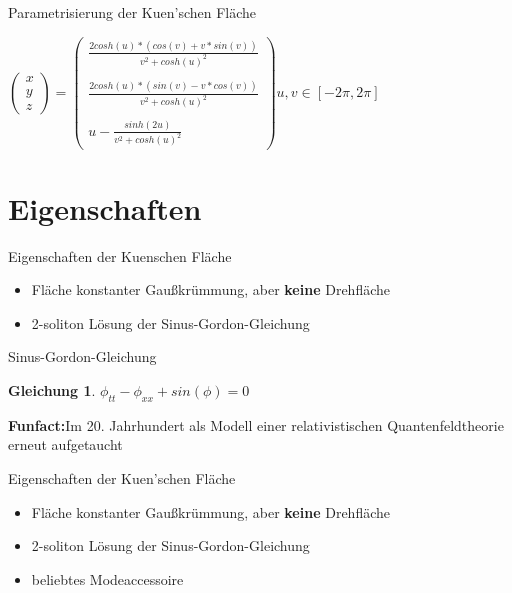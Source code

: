 \documentclass[12pt]{beamer}
\newtheorem{myeq}{Gleichung}
\begin{document}
\begin{frame}{Parametrisierung der Kuen'schen Fläche}

\begin{center}
$
\begin{pmatrix}
x\\y\\z
\end{pmatrix}
 =
\begin{pmatrix}
\frac{2cosh(u)* \left( cos(v) + v*sin(v) \right)}{v^2+cosh(u)^2}\\\\
\frac{2cosh(u)*(sin(v) - v*cos(v))}{v^2 + cosh(u)^2}\\\\
u - \frac{sinh(2u)}{v^2 + cosh(u)^2}
\end{pmatrix}
u,v \in \left[ -2\pi , 2\pi \right] $
\end{center}

\end{frame}

\section{Eigenschaften}
\begin{frame}{Eigenschaften der Kuenschen Fläche}
\begin{itemize}
\item Fläche konstanter Gaußkrümmung, aber \textbf{keine} Drehfläche \cite{wuensch}
\item 2-soliton Lösung der Sinus-Gordon-Gleichung \cite{bruter}
\end{itemize}
\end{frame}

\begin{frame}{Sinus-Gordon-Gleichung}
\begin{myeq}
$\phi_{tt} - \phi_{xx} + sin( \phi ) = 0$
\end{myeq}
\textbf{Funfact:}\newline Im 20. Jahrhundert als Modell einer relativistischen Quantenfeldtheorie erneut aufgetaucht\cite{bruter}
\end{frame}

\begin{frame}{Eigenschaften der Kuen'schen Fläche}
\begin{itemize}
\item Fläche konstanter Gaußkrümmung, aber \textbf{keine} Drehfläche \cite{wuensch}
\item 2-soliton Lösung der Sinus-Gordon-Gleichung \cite{bruter}
\item beliebtes Modeaccessoire
\end{itemize}
\end{frame}
\end{document}
